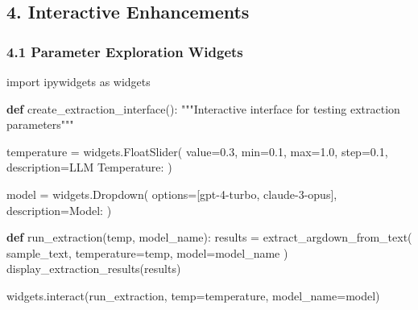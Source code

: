 \documentclass[
  11pt,
  letterpaper,
]{book}
\newenvironment{Shaded}{\begin{snugshade}}{\end{snugshade}}
\newcommand{\BuiltInTok}[1]{\textcolor[rgb]{0.00,0.23,0.31}{#1}}
\newcommand{\CommentTok}[1]{\textcolor[rgb]{0.37,0.37,0.37}{#1}}
\newcommand{\FloatTok}[1]{\textcolor[rgb]{0.68,0.00,0.00}{#1}}
\newcommand{\ImportTok}[1]{\textcolor[rgb]{0.00,0.46,0.62}{#1}}
\newcommand{\KeywordTok}[1]{\textcolor[rgb]{0.00,0.23,0.31}{\textbf{#1}}}
\newcommand{\NormalTok}[1]{\textcolor[rgb]{0.00,0.23,0.31}{#1}}
\newcommand{\OperatorTok}[1]{\textcolor[rgb]{0.37,0.37,0.37}{#1}}
\newcommand{\StringTok}[1]{\textcolor[rgb]{0.13,0.47,0.30}{#1}}
\begin{document}
\subsection{4. Interactive Enhancements}\label{interactive-enhancements}

\subsubsection{4.1 Parameter Exploration
Widgets}\label{parameter-exploration-widgets}

\begin{Shaded}
\begin{Highlighting}[]
\ImportTok{import}\NormalTok{ ipywidgets }\ImportTok{as}\NormalTok{ widgets}

\KeywordTok{def}\NormalTok{ create\_extraction\_interface():}
    \CommentTok{"""Interactive interface for testing extraction parameters"""}
    
\NormalTok{    temperature }\OperatorTok{=}\NormalTok{ widgets.FloatSlider(}
\NormalTok{        value}\OperatorTok{=}\FloatTok{0.3}\NormalTok{, }\BuiltInTok{min}\OperatorTok{=}\FloatTok{0.1}\NormalTok{, }\BuiltInTok{max}\OperatorTok{=}\FloatTok{1.0}\NormalTok{, step}\OperatorTok{=}\FloatTok{0.1}\NormalTok{,}
\NormalTok{        description}\OperatorTok{=}\StringTok{\textquotesingle{}LLM Temperature:\textquotesingle{}}
\NormalTok{    )}
    
\NormalTok{    model }\OperatorTok{=}\NormalTok{ widgets.Dropdown(}
\NormalTok{        options}\OperatorTok{=}\NormalTok{[}\StringTok{\textquotesingle{}gpt{-}4{-}turbo\textquotesingle{}}\NormalTok{, }\StringTok{\textquotesingle{}claude{-}3{-}opus\textquotesingle{}}\NormalTok{],}
\NormalTok{        description}\OperatorTok{=}\StringTok{\textquotesingle{}Model:\textquotesingle{}}
\NormalTok{    )}
    
    \KeywordTok{def}\NormalTok{ run\_extraction(temp, model\_name):}
\NormalTok{        results }\OperatorTok{=}\NormalTok{ extract\_argdown\_from\_text(}
\NormalTok{            sample\_text, }
\NormalTok{            temperature}\OperatorTok{=}\NormalTok{temp,}
\NormalTok{            model}\OperatorTok{=}\NormalTok{model\_name}
\NormalTok{        )}
\NormalTok{        display\_extraction\_results(results)}
    
\NormalTok{    widgets.interact(run\_extraction, temp}\OperatorTok{=}\NormalTok{temperature, model\_name}\OperatorTok{=}\NormalTok{model)}
\end{Highlighting}
\end{Shaded}
\end{document}
